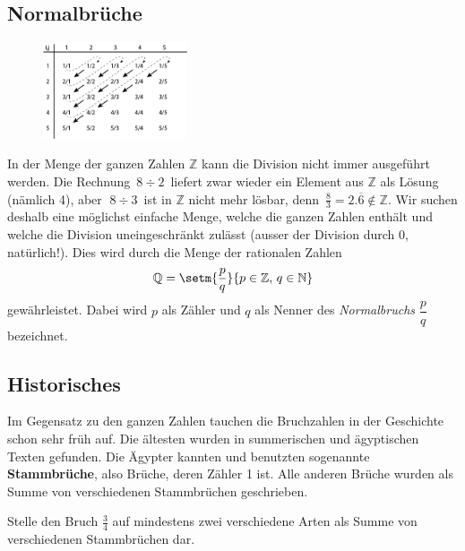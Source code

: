 \documentclass[%
11pt,%
twoside,%
titlepage,%
german,%
headsepline%
]{scrartcl}
\begin{document}
\subsection{Normalbrüche}
\begin{figure}
\vspace{-22pt}
  \begin{center}
    \includegraphics[width=0.38\textwidth]{pictures/Cantor}
  \end{center}
\vspace{-22pt}
\end{figure}
In der Menge der ganzen Zahlen $\mathbb{Z}$ kann die Division nicht immer
ausgeführt werden.
\bsp Die Rechnung $\,8\div 2\,$ liefert zwar wieder ein Element aus $\mathbb{Z}$ als Lösung (nämlich 4), aber $\;8\div 3\,$ ist in $\mathbb{Z}$ nicht mehr lösbar, denn $\,\frac{8}{3}=2.\overline{6}\notin\mathbb{Z}$. 
Wir suchen deshalb eine möglichst einfache Menge, welche die ganzen Zahlen enthält und welche die Division uneingeschränkt zulässt (ausser der Division durch 0, natürlich!).
Dies wird durch die Menge der rationalen Zahlen
$$\mathbb{Q} = \setm{\frac{p}{q}}{p\in\mathbb{Z},\,q\in\mathbb{N}}$$
gewährleistet. Dabei wird $p$ als Zähler und $q$ als Nenner des \textit{Normalbruchs} $\dfrac{p}{q}$
bezeichnet.

\subsection{Historisches}

Im Gegensatz zu den ganzen Zahlen tauchen die Bruchzahlen in der Geschichte schon sehr früh auf. Die ältesten wurden in summerischen und ägyptischen Texten gefunden. Die Ägypter kannten und benutzten sogenannte \textbf{Stammbrüche}, also Brüche, deren Zähler 1 ist. Alle anderen Brüche wurden als Summe von verschiedenen Stammbrüchen geschrieben. 

\begin{ueb}[Stammbrüche]
Stelle den Bruch $\frac{3}{4}$ auf mindestens zwei verschiedene Arten als Summe von verschiedenen Stammbrüchen dar.
\end{ueb}
\end{document}

